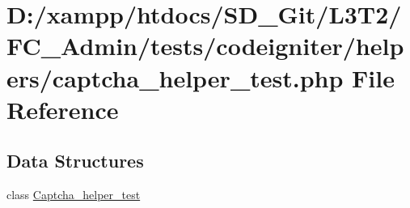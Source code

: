 \hypertarget{_admin_2tests_2codeigniter_2helpers_2captcha__helper__test_8php}{}\section{D\+:/xampp/htdocs/\+S\+D\+\_\+\+Git/\+L3\+T2/\+F\+C\+\_\+\+Admin/tests/codeigniter/helpers/captcha\+\_\+helper\+\_\+test.php File Reference}
\label{_admin_2tests_2codeigniter_2helpers_2captcha__helper__test_8php}
\subsection*{Data Structures}
\begin{DoxyCompactItemize}
\item 
class \hyperlink{class_captcha__helper__test}{Captcha\+\_\+helper\+\_\+test}
\end{DoxyCompactItemize}
